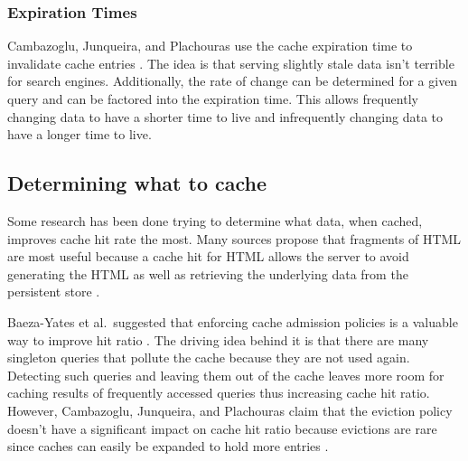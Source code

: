 \documentclass[12pt]{ucthesis}
\begin{document}
\subsubsection{Expiration Times}
Cambazoglu, Junqueira, and Plachouras use the cache expiration time to invalidate cache entries \cite{refreshingPerspectiveSearch}.
The idea is that serving slightly stale data isn't terrible for search engines.
Additionally, the rate of change can be determined for a given query and can be factored into the expiration time.
This allows frequently changing data to have a shorter time to live and infrequently changing data to have a longer time to live.

\subsection{Determining what to cache}
Some research has been done trying to determine what data, when cached, improves cache hit rate the most.
Many sources propose that fragments of HTML are most useful because a cache hit for HTML allows the server to avoid generating the HTML as well as retrieving the underlying data from the persistent store \cite{comparisonOfCachingSolutions, scalableConsistentCaching, howBasecampGotSoFast}.

Baeza-Yates et al.\ suggested that enforcing cache admission policies is a valuable way to improve hit ratio \cite{cacheAdmissionPolicies}.
The driving idea behind it is that there are many singleton queries that pollute the cache because they are not used again.
Detecting such queries and leaving them out of the cache leaves more room for caching results of frequently accessed queries thus increasing cache hit ratio.
However, Cambazoglu, Junqueira, and Plachouras claim that the eviction policy doesn't have a significant impact on cache hit ratio because evictions are rare since caches can easily be expanded to hold more entries \cite{refreshingPerspectiveSearch}.
\end{document}
